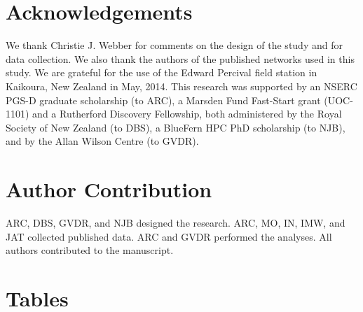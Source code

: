 \documentclass[12pt]{article}
\providecommand{\DIFaddbegin}{} %
\providecommand{\DIFaddend}{} %
\newcommand{\DIFaddincludegraphics}[2][]{{\color{blue}\fbox{\DIFOincludegraphics[#1]{#2}}}} %
\DeclareRobustCommand{\DIFaddbegin}{\DIFOaddbegin \let\includegraphics\DIFaddincludegraphics} %
\DeclareRobustCommand{\DIFaddend}{\DIFOaddend \let\includegraphics\DIFOincludegraphics} %
\begin{document}
\begin{spacing}{1.5}
\DIFaddbegin \clearpage
\DIFaddend 

\section*{Acknowledgements}

  We thank Christie J. Webber for comments on the design of the 
  study and for data collection. 
  We also thank the authors of the published networks used in this study. 
  We are grateful for the use of the Edward Percival field station in Kaikoura, 
  New Zealand in May, 2014. This research was supported by an NSERC PGS-D 
  graduate scholarship (to ARC), a Marsden Fund Fast-Start grant (UOC-1101) and a 
  Rutherford Discovery Fellowship, both administered by the Royal Society of New 
  Zealand (to DBS), a BlueFern HPC PhD scholarship (to NJB), and by
  the Allan Wilson Centre (to GVDR).


\section*{Author Contribution}

  ARC, DBS, GVDR, and NJB designed the research. ARC, MO, IN, IMW, and JAT collected published data. 
  ARC and GVDR performed the analyses. All authors contributed to the manuscript.

\end{spacing}

\newpage

\renewcommand*{\bibfont}{\raggedright}



\newpage
\section*{Tables}
\end{document}
